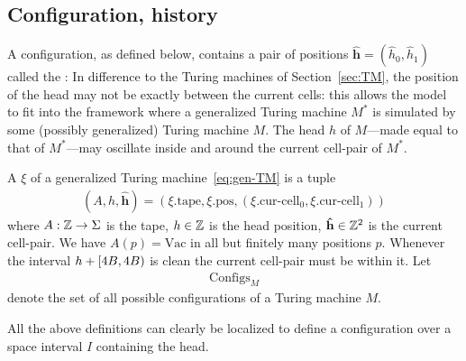 \documentclass[11pt]{memoir}
\theoremstyle{definition} %
\renewcommand{\vek}[1]{\mathbf{#1}}
\def\B{B}
\newcommand{\Configs}{\mathrm{Configs}}
\newcommand{\h}{h} %
\newcommand{\hc}{\hat h}
\newcommand{\vhc}{\vek{\hat h}}
\newcommand{\pos}{\mathrm{pos}}
\newcommand{\curcell}{\textrm{cur-cell}}
\newcommand{\tape}{\mathrm{tape}}
\newcommand{\Vacant}{\mathrm{Vac}}
\begin{document}
\subsection{Configuration, history}\label{sec:gen-TM}

A configuration, as defined below, contains a pair of positions
\( \vhc = (\hc_{0},\hc_{1}) \) called the :
In difference to the Turing machines of Section~\ref{sec:TM},
the position of the head may not be exactly between the current cells: this allows the model
to fit into the framework where 
a generalized Turing machine \( M^{*} \) is simulated by some (possibly
generalized) Turing machine \( M \).
The head \( h \) of \( M \)---made equal to that of \( M^{*} \)---may
oscillate inside and around the current cell-pair of \( M^{*} \).

\begin{definition}[Configuration]\label{def:config}
    A  \( \xi \) of a generalized Turing machine~\eqref{eq:gen-TM} is a tuple
    \begin{align*}
      (A,\h,\vhc) = (\xi.\tape,\xi.\pos, (\xi.\curcell_{0},\xi.\curcell_{1}))
    \end{align*}
    where \( A:\mathbb{Z}\to\Sigma \) is the tape, \( \h \in\bbZ \) is the head position, \( \vhc\in\bbZ^{2} \)
    is the current cell-pair.
    We have \( A(p)=\Vacant \) in all but finitely many positions \( p \).
Whenever the interval \( \h+\lint{4\B}{4\B} \) is clean the current cell-pair
must be within it.
Let
    \begin{align*}
         \Configs_{M}
    \end{align*}
    denote the set of all possible configurations of a Turing machine \( M \).
\end{definition}

All the above definitions can clearly be localized to define a configuration
over a space interval \( I \) containing the head.
\end{document}
